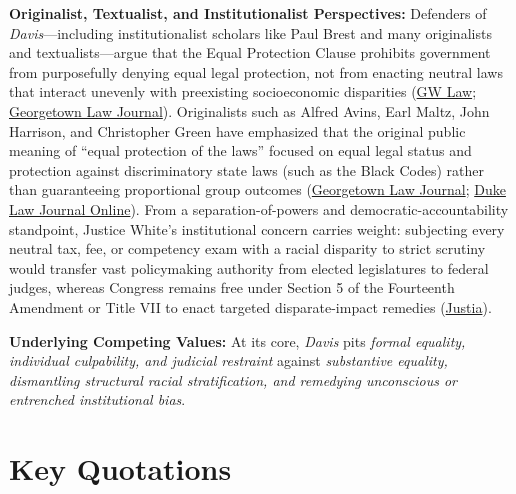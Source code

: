 \documentclass[12pt]{article}
\begin{document}
\textbf{Originalist, Textualist, and Institutionalist Perspectives:} Defenders of \textit{Davis}---including institutionalist scholars like Paul Brest and many originalists and textualists---argue that the Equal Protection Clause prohibits government from purposefully denying equal legal protection, not from enacting neutral laws that interact unevenly with preexisting socioeconomic disparities (\href{https://scholarship.law.gwu.edu/cgi/viewcontent.cgi?params=/context/faculty_publications/article/2030/&path_info=Was_the_Disparate_Impact_Theory_a_Mistake.pdf}{GW Law}; \href{https://www.law.georgetown.edu/georgetown-law-journal/wp-content/uploads/sites/26/2021/11/Bernick_Antisubjugation.pdf}{Georgetown Law Journal}). Originalists such as Alfred Avins, Earl Maltz, John Harrison, and Christopher Green have emphasized that the original public meaning of ``equal protection of the laws'' focused on equal legal status and protection against discriminatory state laws (such as the Black Codes) rather than guaranteeing proportional group outcomes (\href{https://www.law.georgetown.edu/georgetown-law-journal/wp-content/uploads/sites/26/2021/11/Bernick_Antisubjugation.pdf}{Georgetown Law Journal}; \href{https://scholarship.law.duke.edu/cgi/viewcontent.cgi?article=1069&context=dlj_online}{Duke Law Journal Online}). From a separation-of-powers and democratic-accountability standpoint, Justice White's institutional concern carries weight: subjecting every neutral tax, fee, or competency exam with a racial disparity to strict scrutiny would transfer vast policymaking authority from elected legislatures to federal judges, whereas Congress remains free under Section 5 of the Fourteenth Amendment or Title VII to enact targeted disparate-impact remedies (\href{https://supreme.justia.com/cases/federal/us/426/229/}{Justia}).

\textbf{Underlying Competing Values:} At its core, \textit{Davis} pits \textit{formal equality, individual culpability, and judicial restraint} against \textit{substantive equality, dismantling structural racial stratification, and remedying unconscious or entrenched institutional bias}.

\section{Key Quotations}
\end{document}

